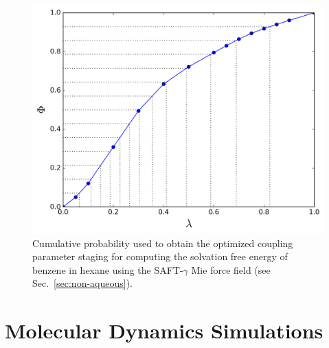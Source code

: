 \documentclass[preprint]{elsarticle}
\begin{document}
	\begin{figure}
		\centering
		\includegraphics[width=0.9\columnwidth]{Figures/optimized_cdf}
		\caption{Cumulative probability used to obtain the optimized coupling parameter staging for computing the solvation free energy of benzene in hexane using the SAFT-$\gamma$ Mie force field (see Sec.~\ref{sec:non-aqueous}).}
		\label{fig:optimized_cdf}
	\end{figure}
	
	\section{Molecular Dynamics Simulations}\label{mds}
	
\end{document}
